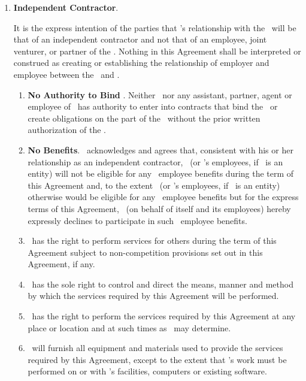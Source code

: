 \documentclass[a4paper,10pt,notitlepage,twocolumn]{article}
\begin{document}
\begin{enumerate}
\item  \textbf{Independent Contractor}. 
 
It is the express intention of the parties that \cntrref 's relationship with the \clref\ will be that of an independent contractor and not that of an employee, joint venturer, or partner of the \clref .  Nothing in this Agreement shall be interpreted or construed as creating or establishing the relationship of employer and employee between the \clref\ and \cntrref. 
\begin{enumerate}

	\item 	\textbf{No Authority to Bind \clref} .  Neither \cntrref\, nor any assistant, partner, agent or employee of \cntrref\, has authority to enter into contracts that bind the \clref\ or create obligations on the part of the \clref\ without the prior written authorization of the \clref.
	
	\item 	\textbf{No Benefits}.  \cntrref\ acknowledges and agrees that, consistent with his or her relationship as an independent contractor, \cntrref\ (or \cntrref 's employees, if \cntrref\ is an entity) will not be eligible for any \clref\ employee benefits during the term of this Agreement and, to the extent \cntrref\ (or \cntrref 's employees, if \cntrref\ is an entity) otherwise would be eligible for any \clref\ employee benefits but for the express terms of this Agreement, \cntrref\ (on behalf of itself and its employees) hereby expressly declines to participate in such \clref\ employee benefits.
	
	\item   \cntrref\ has the right to perform services for others during the term of this Agreement subject to non-competition provisions set out in this Agreement, if any.

	\item  \cntrref\ has the sole right to control and direct the means, manner and method by which the services required by this Agreement will be performed.

	\item  \cntrref\ has the right to perform the services required by this Agreement at any place or location and at such times as \cntrref\ may determine.

	\item  \cntrref\ will furnish all equipment and materials used to provide the services required by this Agreement, except to the extent that \cntrref 's work must be performed on or with \clref 's facilities, computers or existing software.


\end{enumerate}
\end{enumerate}
\end{document}
